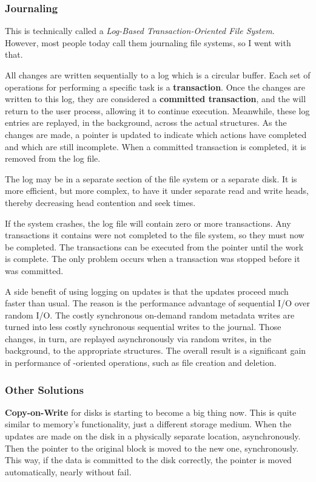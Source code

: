 \subsubsection{Journaling}\label{subsubsec:Journaling}
This is technically called a \emph{Log-Based Transaction-Oriented File System}.
However, most people today call them journaling file systems, so I went with that.

All  changes are written sequentially to a log which is a circular buffer.
Each set of operations for performing a specific task is a \textbf{transaction}.
Once the changes are written to this log, they are considered a \textbf{committed transaction}, and the  will return to the user process, allowing it to continue execution.
Meanwhile, these log entries are replayed, in the background, across the actual  structures.
As the changes are made, a pointer is updated to indicate which actions have completed and which are still incomplete.
When a committed transaction is completed, it is removed from the log file.

The log may be in a separate section of the file system or a separate disk.
It is more efficient, but more complex, to have it under separate read and write heads, thereby decreasing head contention and seek times.

If the system crashes, the log file will contain zero or more transactions.
Any transactions it contains were not completed to the file system, so they must now be completed.
The transactions can be executed from the pointer until the work is complete.
The only problem occurs when a transaction was stopped before it was committed.

A side benefit of using logging on  updates is that the updates proceed much faster than usual.
The reason is the performance advantage of sequential I/O over random I/O.
The costly synchronous on-demand random metadata writes are turned into less costly synchronous sequential writes to the journal.
Those changes, in turn, are replayed asynchronously via random writes, in the background, to the appropriate structures.
The overall result is a significant gain in performance of -oriented operations, such as file creation and deletion.

\subsubsection{Other Solutions}\label{subsubsec:Other_FS_Recovery_Solutions}
\textbf{Copy-on-Write} for disks is starting to become a big thing now.
This is quite similar to memory's  functionality, just a different storage medium.
When the updates are made on the disk in a physically separate location, asynchronously.
Then the pointer to the original block is moved to the new one, synchronously.
This way, if the data is committed to the disk correctly, the pointer is moved automatically, nearly without fail.

